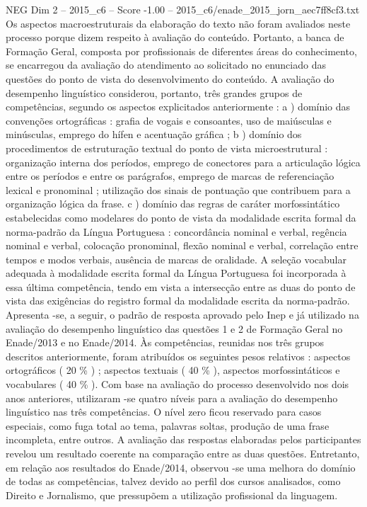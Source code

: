 \begin{textsample}{NEG Dim 2 – 2015\_c6 – Score -1.00 – 2015\_c6/enade\_2015\_jorn\_aec7ff8cf3.txt}
Os aspectos macroestruturais da elaboração do texto não foram avaliados neste processo porque dizem respeito à avaliação do conteúdo.
Portanto, a banca de Formação Geral, composta por profissionais de diferentes áreas do conhecimento, se encarregou da avaliação do atendimento ao solicitado no enunciado das questões do ponto de vista do desenvolvimento do conteúdo.
A avaliação do desempenho linguístico considerou, portanto, três grandes grupos de competências, segundo os aspectos explicitados anteriormente : a ) domínio das convenções ortográficas : grafia de vogais e consoantes, uso de maiúsculas e minúsculas, emprego do hífen e acentuação gráfica ; b ) domínio dos procedimentos de estruturação textual do ponto de vista microestrutural : organização interna dos períodos, emprego de conectores para a articulação lógica entre os períodos e entre os parágrafos, emprego de marcas de referenciação lexical e pronominal ; utilização dos sinais de pontuação que contribuem para a organização lógica da frase. c ) domínio das regras de caráter morfossintático estabelecidas como modelares do ponto de vista da modalidade escrita formal da norma-padrão da Língua Portuguesa : concordância nominal e verbal, regência nominal e verbal, colocação pronominal, flexão nominal e verbal, correlação entre tempos e modos verbais, ausência de marcas de oralidade.
A seleção vocabular adequada à modalidade escrita formal da Língua Portuguesa foi incorporada à essa última competência, tendo em vista a intersecção entre as duas do ponto de vista das exigências do registro formal da modalidade escrita da norma-padrão.
Apresenta -se, a seguir, o padrão de resposta aprovado pelo Inep e já utilizado na avaliação do desempenho linguístico das questões 1 e 2 de Formação Geral no Enade/2013 e no Enade/2014.
Às competências, reunidas nos três grupos descritos anteriormente, foram atribuídos os seguintes pesos relativos : aspectos ortográficos ( 20 \% ) ; aspectos textuais ( 40 \% ), aspectos morfossintáticos e vocabulares ( 40 \% ).
Com base na avaliação do processo desenvolvido nos dois anos anteriores, utilizaram -se quatro níveis para a avaliação do desempenho linguístico nas três competências.
O nível zero ficou reservado para casos especiais, como fuga total ao tema, palavras soltas, produção de uma frase incompleta, entre outros.
A avaliação das respostas elaboradas pelos participantes revelou um resultado coerente na comparação entre as duas questões.
Entretanto, em relação aos resultados do Enade/2014, observou -se uma melhora do domínio de todas as competências, talvez devido ao perfil dos cursos analisados, como Direito e Jornalismo, que pressupõem a utilização profissional da linguagem.

\end{textsample}
